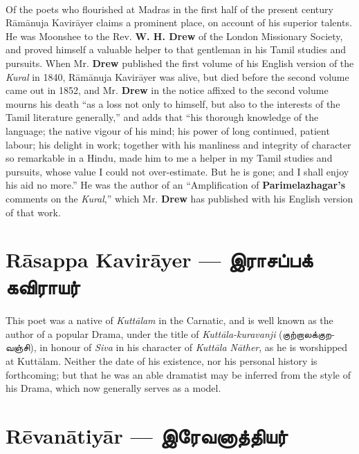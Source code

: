 \documentclass{article}
\newcommand{\TamilText}[1]{\texttamil{#1}}
\newcommand{\TamilBold}[1]{\texttamil{\textbf{#1}}}
\newcommand{\tam}[1]{\TamilText{#1}}
\newcommand{\tambold}[1]{\TamilBold{#1}}
\begin{document}
\paragraph{}
Of the poets who flourished at Madras in the first half of the present century R\={a}m\={a}nuja Kavir\={a}yer claims a prominent place, on account of his superior talents. He was Moonshee to the Rev. \textbf{W. H. Drew} of the London Missionary Society, and proved himself a valuable helper to that gentleman in his Tamil studies and pursuits. When Mr. \textbf{Drew} published the first volume of his English version of the \emph{Kural} in 1840, R\={a}m\={a}nuja Kavir\={a}yer was alive, but died before the second volume came out in 1852, and Mr. \textbf{Drew} in the notice affixed to the second volume mourns his death ``as a loss not only to himself, but also to the interests of the Tamil literature generally,'' and adds that ``his thorough knowledge of the language; the native vigour of his mind; his power of long continued, patient labour; his delight in work; together with his manliness and integrity of character so remarkable in a Hindu, made him to me a helper in my Tamil studies and pursuits, whose value I could not over-estimate. But he is gone; and I shall enjoy his aid no more.'' He was the author of an ``Amplification of \textbf{Parimelazhagar's} comments on the \emph{Kural},'' which Mr. \textbf{Drew} has published with his English version of that work.

\section{R\={a}sappa Kavir\={a}yer --- \tambold{இராசப்பக் கவிராயர்}}
\paragraph{}
This poet was a native of \emph{Kutt\={a}lam} in the Carnatic, and is well known as the author of a popular Drama, under the title of \emph{Kutt\={a}la-kuravanji} (\tam{குற்றாலக்குறவஞ்சி}), in honour of \emph{Siva} in his character of \emph{Kutt\={a}la N\={a}ther}, as he is worshipped at Kutt\={a}lam. Neither the date of his existence, nor his personal history is forthcoming; but that he was an able dramatist may be inferred from the style of his Drama, which now generally serves as a model.

\section{R\={e}van\={a}tiy\={a}r --- \tambold{இரேவனாத்தியர்}}
\end{document}
